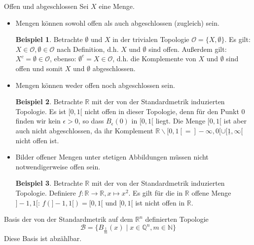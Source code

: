 \documentclass[a4paper,11pt,notitlepage]{report}
\theoremstyle{definition}
\newtheorem{example}{Beispiel}[chapter]
\newcommand{\R}{{\ensuremath{\mathbb{R}}}}
\newcommand{\N}{{\ensuremath{\mathbb{N}}}}
\newcommand{\Q}{{\ensuremath{\mathbb{Q}}}}
\newcommand{\OO}{{\ensuremath{\mathcal{O}}}}
\begin{document}
\begin{section}{Offen und abgeschlossen}
	Sei $X$ eine Menge.
	\begin{itemize}
		\item Mengen können sowohl offen als auch abgeschlossen (zugleich) sein.
			\begin{example}
				Betrachte $\emptyset$ und $X$ in der trivialen Topologie $\OO = \{X, \emptyset\}$.
					\newline
					Es gilt: $X \in \OO, \emptyset \in \OO$ nach Definition, d.h. $X$ und $\emptyset$ sind offen.
					\newline
					Außerdem gilt: $X^c = \emptyset \in \OO$, ebenso: $\emptyset^c = X \in \OO$, d.h. die Komplemente von $X$ und $\emptyset$ sind offen und somit $X$ und $\emptyset$ abgeschlossen.
			\end{example}
			
		\item Mengen können weder offen noch abgeschlossen sein.
			\begin{example}
				Betrachte $\R$ mit der von der Standardmetrik induzierten Topologie. Es ist $[0,1[$ nicht offen in dieser Topologie, denn für den Punkt $0$ finden wir kein $\epsilon > 0$, so dass $B_\epsilon(0)$ in $[0,1[$ liegt.
				Die Menge $[0,1[$ ist aber auch nicht abgeschlossen, da ihr Komplement $\R \backslash [0,1[ = ]-\infty,0[ \cup [\underline{1},\infty[$ nicht offen ist.
			\end{example}
		\item Bilder offener Mengen unter stetigen Abbildungen müssen nicht notwendigerweise offen sein.
			\begin{example}
				Betrachte $\R$ mit der von der Standardmetrik induzierten Topologie.
				\newline
				Definiere $f \colon \R \rightarrow \R, x \mapsto x^2$.
				\newline
				Es gilt für die in $\R$ offene Menge $]-1,1[$:
				\newline
				$f(]-1,1[)=[0,1[$ und $[0,1[$ ist nicht offen in $\R$.
			\end{example}
	\end{itemize}
\end{section}

\begin{section}{Basis der von der Standardmetrik auf dem $\R^n$ definierten Topologie}
	$$\mathcal{B} = \{B_{\frac{1}{m}}(x) \mid x \in \Q^n, m \in \N\}$$
	Diese Basis ist abzählbar.
\end{section}
\end{document}
